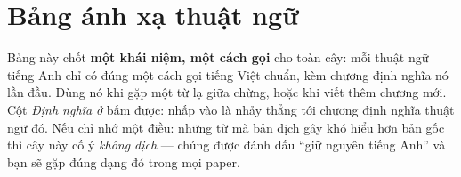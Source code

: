 \documentclass[deep_learning.tex]{subfiles}
\begin{document}
\chapter*{Bảng ánh xạ thuật ngữ}

\begin{tomtat}
Bảng này chốt \textbf{một khái niệm, một cách gọi} cho toàn cây: mỗi thuật ngữ tiếng Anh chỉ có đúng một cách gọi tiếng Việt chuẩn, kèm chương định nghĩa nó lần đầu. Dùng nó khi gặp một từ lạ giữa chừng, hoặc khi viết thêm chương mới. Cột \emph{Định nghĩa ở} bấm được: nhấp vào là nhảy thẳng tới chương định nghĩa thuật ngữ đó. Nếu chỉ nhớ một điều: những từ mà bản dịch gây khó hiểu hơn bản gốc thì cây này cố ý \emph{không dịch} --- chúng được đánh dấu ``giữ nguyên tiếng Anh'' và bạn sẽ gặp đúng dạng đó trong mọi paper.
\end{tomtat}
\end{document}
